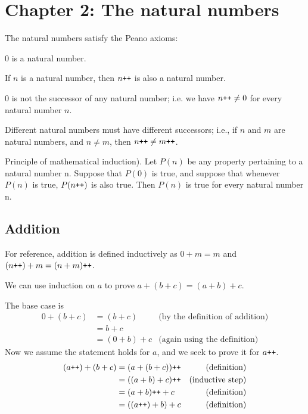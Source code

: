 \section*{Chapter 2: The natural numbers}
The natural numbers satisfy the Peano axioms:

\begin{axiom}
  $0$ is a natural number.
\end{axiom}
\begin{axiom}
  If $n$ is a natural number, then $n\texttt{++}$ is also a natural number.
\end{axiom}
\begin{axiom}
  $0$ is not the successor of any natural number; i.e. we have $n\texttt{++} \neq 0$ for every natural number $n$.
\end{axiom}
\begin{axiom}
  Different natural numbers must have different successors; i.e., if $n$ and $m$ are natural numbers, and $n \neq m$, then $n\texttt{++} \neq m\texttt{++}$.
\end{axiom}
\begin{axiom}
  Principle of mathematical induction). Let $P(n)$ be
any property pertaining to a natural number n. Suppose that $P(0)$
is true, and suppose that whenever $P(n)$ is true, $P(n\texttt{++})$ is also
true. Then $P(n)$ is true for every natural number n.
\end{axiom}

\subsection*{Addition}
For reference, addition is defined inductively as $0 + m = m$ and $(n\texttt{++}) + m = (n + m)\texttt{++}$.

We can use induction on $a$ to prove $a + (b + c) = (a + b) + c$.

The base case is
\begin{align*}
  0 + (b + c) &= (b + c) &\text{(by the definition of addition)}\\
              &= b + c  & \\
              &= (0 + b) + c &\text{(again using the definition)}
\end{align*}
Now we assume the statement holds for $a$, and we seek to prove it for $a\texttt{++}$.
\begin{align*}
  (a\texttt{++}) + (b+c) &= (a + (b+c))\texttt{++} &\text{(definition)}\\
                &= ((a + b) + c)\texttt{++} &\text{(inductive step)}\\
                &= (a+b)\texttt{++} + c &\text{(definition)}\\
                &= ((a\texttt{++}) + b) + c &\text{(definition)}
\end{align*}

